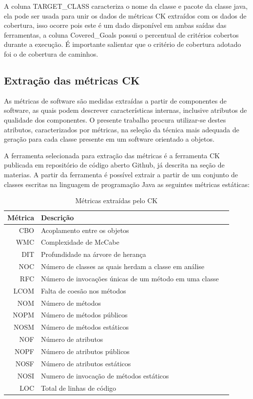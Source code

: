 \documentclass[
	12pt,				%
	oneside,			%
	a4paper,			%
	english,			%
	brazil				%
	]{abntex2ppgsi}
\begin{document}
A coluna TARGET\_CLASS caracteriza o nome da classe e pacote da classe java, ela pode ser usada para unir os dados de métricas CK extraídos com os dados de cobertura, isso ocorre pois este é um dado disponível em ambas saídas das ferramentas, a coluna Covered\_Goals possui o percentual de critérios cobertos durante a execução. É importante salientar que o critério de cobertura adotado foi o de cobertura de caminhos.



\subsection{Extração das métricas CK}
As métricas de software são medidas extraídas a partir de componentes de software, as quais podem descrever características internas, inclusive atributos de qualidade dos componentes. O presente trabalho procura utilizar-se destes atributos, caracterizados por métricas, na seleção da técnica mais adequada de geração para cada classe presente em um software orientado a objetos.

A ferramenta selecionada para extração das métricas é a ferramenta CK publicada em repositório de código aberto Github, já descrita na seção de materias. A partir da ferramenta é possível extrair a partir de um conjunto de classes escritas na linguagem de programação Java as seguintes métricas estáticas:


\begin{table}[h]

\centering
\caption{Métricas extraídas pelo CK}
\vspace{0.5cm}
\begin{tabular}{r|lr}

Métrica  & Descrição \\ %
\hline                               %
CBO & Acoplamento entre os objetos \\
WMC & Complexidade de McCabe \\	  
DIT & Profundidade na árvore de herança \\	 
NOC & Número de classes as quais herdam a classe em análise \\   
RFC & Número de invocações únicas de um método em uma classe \\	 
LCOM & Falta de coesão nos métodos \\	
NOM & Número de métodos \\	 
NOPM & Número de métodos públicos	 \\ 
NOSM & Número de métodos estáticos \\	
NOF & Número de atributos\\	  
NOPF & Número de atributos públicos \\	
NOSF & Número de atributos estáticos \\	
NOSI & Numero de invocação de métodos estáticos  \\	
LOC & Total de linhas de código


\end{tabular}
\label{table:metricas-extraidas-ck}
\end{table}
\end{document}
